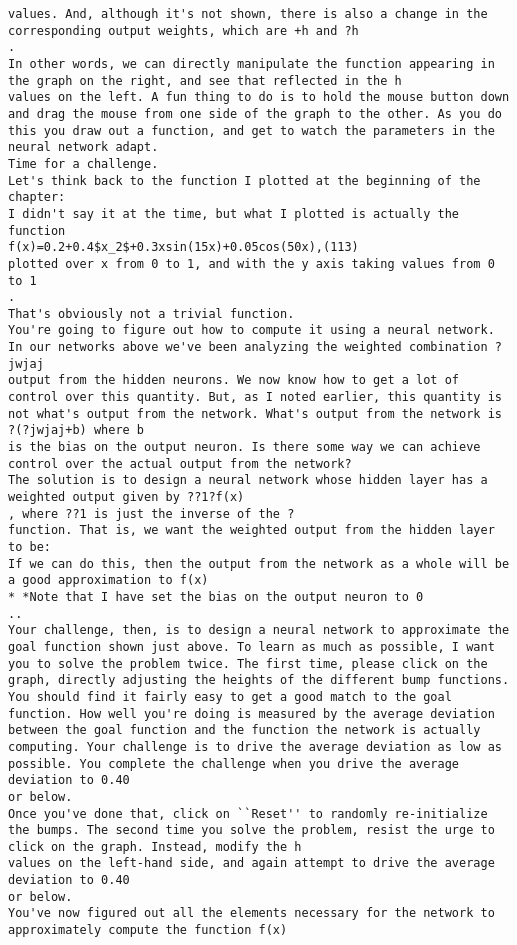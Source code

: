\begin{lstlisting}
values. And, although it's not shown, there is also a change in the corresponding output weights, which are +h and ?h
.
In other words, we can directly manipulate the function appearing in the graph on the right, and see that reflected in the h
values on the left. A fun thing to do is to hold the mouse button down and drag the mouse from one side of the graph to the other. As you do this you draw out a function, and get to watch the parameters in the neural network adapt.
Time for a challenge.
Let's think back to the function I plotted at the beginning of the chapter:
I didn't say it at the time, but what I plotted is actually the function 
f(x)=0.2+0.4$x_2$+0.3xsin(15x)+0.05cos(50x),(113)
plotted over x from 0 to 1, and with the y axis taking values from 0 to 1
.
That's obviously not a trivial function.
You're going to figure out how to compute it using a neural network.
In our networks above we've been analyzing the weighted combination ?jwjaj
output from the hidden neurons. We now know how to get a lot of control over this quantity. But, as I noted earlier, this quantity is not what's output from the network. What's output from the network is ?(?jwjaj+b) where b
is the bias on the output neuron. Is there some way we can achieve control over the actual output from the network?
The solution is to design a neural network whose hidden layer has a weighted output given by ??1?f(x)
, where ??1 is just the inverse of the ?
function. That is, we want the weighted output from the hidden layer to be:
If we can do this, then the output from the network as a whole will be a good approximation to f(x)
* *Note that I have set the bias on the output neuron to 0
..
Your challenge, then, is to design a neural network to approximate the goal function shown just above. To learn as much as possible, I want you to solve the problem twice. The first time, please click on the graph, directly adjusting the heights of the different bump functions. You should find it fairly easy to get a good match to the goal function. How well you're doing is measured by the average deviation between the goal function and the function the network is actually computing. Your challenge is to drive the average deviation as low as possible. You complete the challenge when you drive the average deviation to 0.40
or below.
Once you've done that, click on ``Reset'' to randomly re-initialize the bumps. The second time you solve the problem, resist the urge to click on the graph. Instead, modify the h
values on the left-hand side, and again attempt to drive the average deviation to 0.40
or below.
You've now figured out all the elements necessary for the network to approximately compute the function f(x)

\end{lstlisting}

